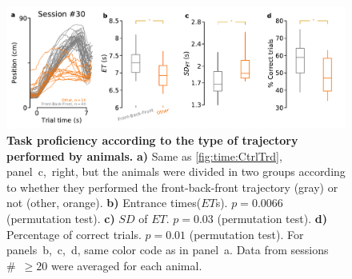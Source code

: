 \begin{figure}[!h]
  \begin{center}
    \includegraphics[width=\textwidth]{ch-appendicies/figures/BadCtrl.pdf}
    \caption[Different Control Trajectory Groups]
    {\textbf{Task proficiency according to the type of trajectory performed by animals.}
    \textbf{a)}
    Same as \autoref{fig:time:CtrlTrd}, panel~c,~right, but the animals were divided in two groups according to whether they performed the front-back-front trajectory (gray) or not (other, orange).
    \textbf{b)}
    Entrance times($ET$s).
    $p=0.0066$ (permutation test).
    \textbf{c)}
    $SD$ of $ET$.
    $p=0.03$ (permutation test).
    \textbf{d)}
    Percentage of correct trials.
    $p=0.01$ (permutation test).
    For panels~b,~c,~d, same color code as in panel~a.
    Data from sessions \#~$\geq20$ were averaged for each animal.
    }
    \label{fig:appendix:BadCtrl}
  \end{center}
\end{figure} 
